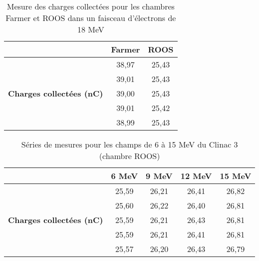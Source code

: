 \documentclass{article}
\begin{document}
\begin{table}[h]
  \centering
  \begin{tabular}{c|cc|}
  \cline{2-3}
   & \textbf{Farmer} & \textbf{ROOS} \\ \hline
  \multicolumn{1}{|c|}{\multirow{5}{*}{\textbf{Charges collectées (nC)}}} & 38,97 & 25,43 \\
  \multicolumn{1}{|c|}{} & 39,01 & 25,43 \\
  \multicolumn{1}{|c|}{} & 39,00 & 25,43 \\
  \multicolumn{1}{|c|}{} & 39,01 & 25,42 \\
  \multicolumn{1}{|c|}{} & 38,99 & 25,43 \\ \hline
  \end{tabular}
  \caption{Mesure des charges collectées pour les chambres Farmer et ROOS dans un faisceau d'électrons de 18 MeV}
\end{table}

\begin{table}[h]
  \centering
  \begin{tabular}{c|cccc|}
  \cline{2-5}
   & \textbf{6 MeV} & \textbf{9 MeV} & \textbf{12 MeV} & \textbf{15 MeV} \\ \hline
  \multicolumn{1}{|c|}{\multirow{5}{*}{\textbf{Charges collectées (nC)}}} & 25,59 & 26,21 & 26,41 & 26,82 \\
  \multicolumn{1}{|c|}{} & 25,60 & 26,22 & 26,40 & 26,81 \\
  \multicolumn{1}{|c|}{} & 25,59 & 26,21 & 26,43 & 26,81 \\
  \multicolumn{1}{|c|}{} & 25,59 & 26,21 & 26,41 & 26,81 \\
  \multicolumn{1}{|c|}{} & 25,57 & 26,20 & 26,43 & 26,79 \\ \hline
  \end{tabular}
  \caption{Séries de mesures pour les champs de 6 à 15 MeV du Clinac 3 (chambre ROOS)}
\end{table}
\end{document}
